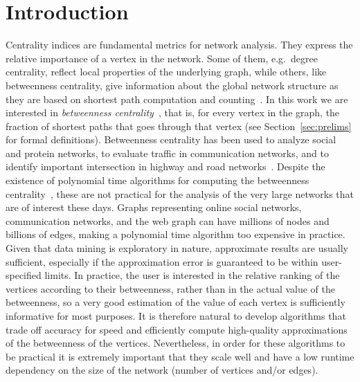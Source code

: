 \section{Introduction}\label{sec:intro}
Centrality indices are fundamental metrics for network analysis. They express the
relative importance of a vertex in the network. Some of them, e.g.~degree
centrality, reflect local properties of the underlying graph, while others,
like betweenness centrality, give information about the global network structure
as they are based on shortest path computation and counting~\citep{Newman10}. In
this work we are interested in \emph{betweenness
centrality}~\citep{Anthonisse71,Freeman77}, that is, for every vertex in the
graph, the fraction of shortest paths that goes through that vertex (see
Section~\ref{sec:prelims} for formal definitions). Betweenness centrality has
been used to analyze social and protein networks, to evaluate traffic in
communication networks, and to identify important intersection in highway and
road networks~\citep{Newman10,GeisbergerSS08}. Despite the existence of
polynomial time algorithms for computing the betweenness
centrality~\citep{Brandes01}, these are not practical for the analysis of the
very large networks that are of interest these days. Graphs representing online
social networks, communication networks, and the web graph can have millions of
nodes and billions of edges, making a polynomial time algorithm too expensive in
practice. Given that data mining is exploratory in nature, approximate results
are usually sufficient, especially if the approximation error is guaranteed to be
within user-specified limits. In practice, the user is interested in the
relative ranking of the vertices according to their betweenness, rather than in
the actual value of the betweenness, so a very good estimation of the value
of each vertex is sufficiently informative for most purposes. It is therefore
natural to develop algorithms that trade off accuracy for speed and efficiently 
compute high-quality approximations of the betweenness of the vertices.
Nevertheless, in order for these algorithms to be practical it is extremely
important that they scale well and have a low runtime dependency on the size of
the network (number of vertices and/or edges).


